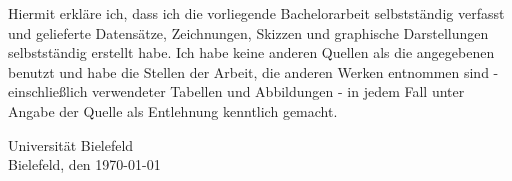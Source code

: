 \documentclass[../Main.tex]{subfiles}
\begin{document}
\vspace*{2\baselineskip}

Hiermit erkläre ich, dass ich die vorliegende Bachelorarbeit selbstständig verfasst und
gelieferte Datensätze, Zeichnungen, Skizzen und graphische Darstellungen selbstständig
erstellt habe. Ich habe keine anderen Quellen als die angegebenen benutzt und habe die
Stellen der Arbeit, die anderen Werken entnommen sind - einschlie{\ss}lich verwendeter
Tabellen und Abbildungen - in jedem Fall unter Angabe der Quelle als Entlehnung kenntlich
gemacht.

\vspace*{3\baselineskip}

\center Universität Bielefeld\\

\center Bielefeld, den \today
\vspace*{3\baselineskip}


\makeatletter
\newcommand*{\textoverline}[1]{$\overline{\hbox{#1}}\m@th$}
\makeatother


\makebox[2.5in]{\hrulefill}

\end{document}
